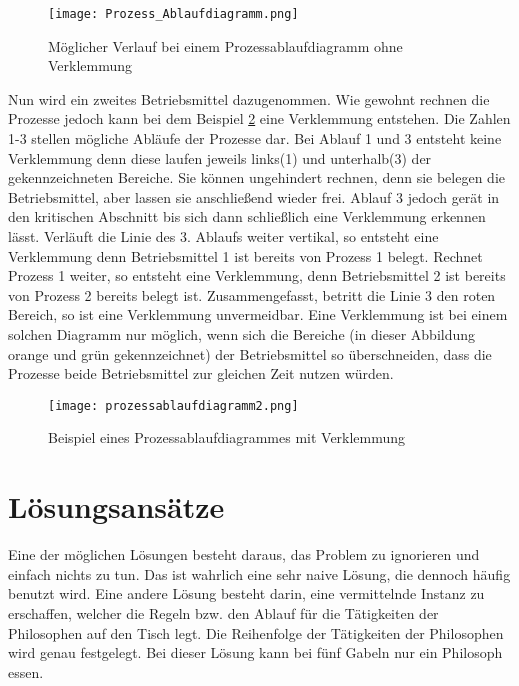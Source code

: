 \begin{figure}[H]
\caption{Möglicher Verlauf bei einem Prozessablaufdiagramm ohne Verklemmung}
\label{fig:normales_Ablaufdiagramm}
\centering
\texttt{[image: Prozess\_Ablaufdiagramm.png]}
\end{figure}

Nun wird ein zweites Betriebsmittel dazugenommen. Wie gewohnt rechnen die Prozesse jedoch kann bei dem Beispiel \ref{fig:verklemmtes_ablaufdiagramm} eine Verklemmung entstehen. Die Zahlen 1-3 stellen mögliche Abläufe der Prozesse dar. Bei Ablauf 1 und 3 entsteht keine Verklemmung denn diese laufen jeweils links(1) und unterhalb(3) der gekennzeichneten Bereiche. Sie können ungehindert rechnen, denn sie belegen die Betriebsmittel, aber lassen sie anschließend wieder frei. Ablauf 3 jedoch gerät in den kritischen Abschnitt bis sich dann schließlich eine Verklemmung erkennen lässt. Verläuft die Linie des 3. Ablaufs weiter vertikal, so entsteht eine Verklemmung denn Betriebsmittel 1 ist bereits von Prozess 1 belegt. Rechnet Prozess 1 weiter, so entsteht eine Verklemmung, denn Betriebsmittel 2 ist bereits von Prozess 2 bereits belegt ist. Zusammengefasst, betritt die Linie 3 den roten Bereich, so ist eine Verklemmung unvermeidbar.
Eine Verklemmung ist bei einem solchen Diagramm nur möglich, wenn sich die Bereiche (in dieser Abbildung orange und grün gekennzeichnet) der Betriebsmittel so überschneiden, dass die Prozesse beide Betriebsmittel zur gleichen Zeit nutzen würden.

\begin{figure}[H]
\caption{Beispiel eines Prozessablaufdiagrammes mit Verklemmung}
\label{fig:verklemmtes_ablaufdiagramm}
\centering
\texttt{[image: prozessablaufdiagramm2.png]}
\end{figure}

\section{Lösungsansätze}
\label{lösung}

Eine der möglichen Lösungen besteht daraus, das Problem zu ignorieren und einfach nichts zu tun. Das ist wahrlich eine sehr naive Lösung, die dennoch häufig benutzt wird. 
Eine andere Lösung besteht darin, eine vermittelnde Instanz zu erschaffen, welcher die Regeln bzw. den Ablauf für die Tätigkeiten der Philosophen auf den Tisch legt. Die Reihenfolge der Tätigkeiten der Philosophen wird genau festgelegt. Bei dieser Lösung kann bei fünf Gabeln nur ein Philosoph essen.\parencite[vgl.][S.220]{tanenbaum2016}

